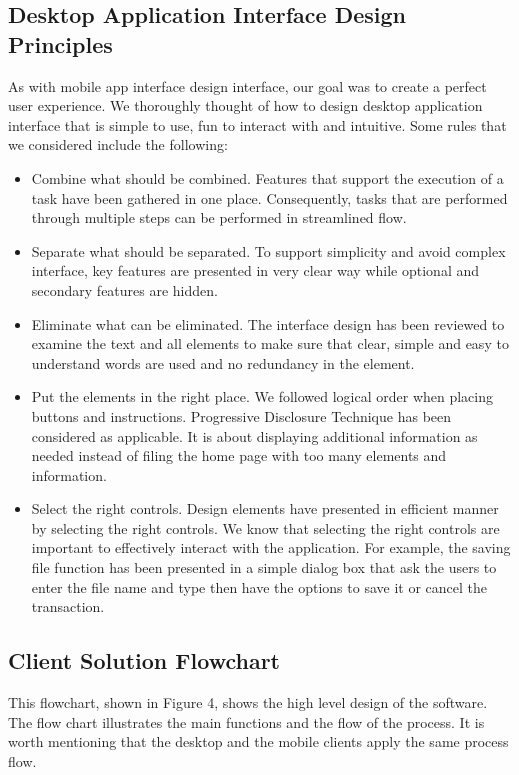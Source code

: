 \documentclass{article}
\begin{document}
\subsection{Desktop Application Interface Design Principles}
As with mobile app interface design interface, our goal was to create a perfect user experience. We thoroughly thought of how to design desktop application interface that is simple to use, fun to interact with and intuitive. Some rules that we considered include the following:
\begin{itemize}
\item Combine what should be combined. Features that support the execution of a task have been gathered in one place. Consequently, tasks that are performed through multiple steps can be performed in streamlined flow.
\item Separate what should be separated. To support simplicity and avoid complex interface, key features are presented in very clear way while optional and secondary features are hidden.
\item Eliminate what can be eliminated. The interface design has been reviewed to examine the text and all elements to make sure that clear, simple and easy to understand words are used and no redundancy in the element.
\item Put the elements in the right place. We followed logical order when placing buttons and instructions. Progressive Disclosure Technique has been considered as applicable. It is about displaying additional information as needed instead of filing the home page with too many elements and information.
\item Select the right controls. Design elements have presented in efficient manner by selecting the right controls. We know that selecting the right controls are important to effectively interact with the application. For example, the saving file function has been presented in a simple dialog box that ask the users to enter the file name and type then have the options to save it or cancel the transaction.
\end{itemize}

\subsection{Client Solution Flowchart}
This flowchart, shown in Figure 4, shows the high level design of the software. The flow chart illustrates the main functions and the flow of the process. It is worth mentioning that the desktop and the mobile clients apply the same process flow.
\end{document}
